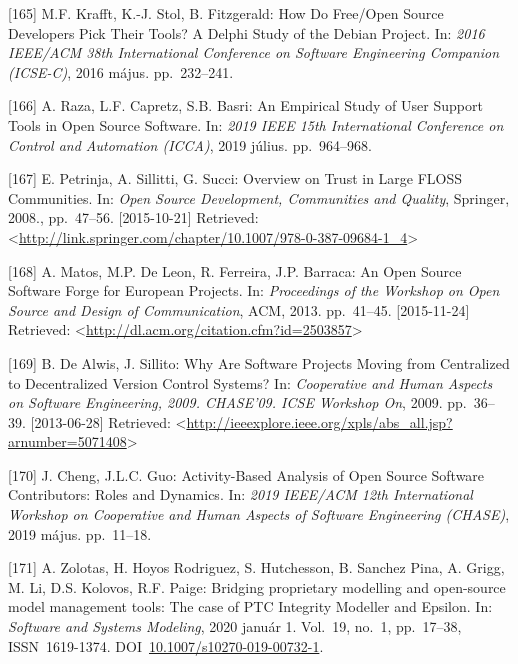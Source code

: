 \documentclass[12pt,magyar,a4paper,oneside]{scrreprt}
\newenvironment{cslreferences}%
  {}%
  {\par}
\begin{document}
\begin{cslreferences}
\leavevmode\hypertarget{ref-krafft_how_2016}{}%
{[}165{]} M.F. Krafft, K.-J. Stol, B. Fitzgerald: How Do Free/Open
Source Developers Pick Their Tools? A Delphi Study of the Debian
Project. In: \emph{2016 IEEE/ACM 38th International Conference on
Software Engineering Companion (ICSE-C)}, 2016 május. pp.~232--241.

\leavevmode\hypertarget{ref-raza_empirical_2019}{}%
{[}166{]} A. Raza, L.F. Capretz, S.B. Basri: An Empirical Study of User
Support Tools in Open Source Software. In: \emph{2019 IEEE 15th
International Conference on Control and Automation (ICCA)}, 2019 július.
pp.~964--968.

\leavevmode\hypertarget{ref-petrinja_overview_2008}{}%
{[}167{]} E. Petrinja, A. Sillitti, G. Succi: Overview on Trust in Large
FLOSS Communities. In: \emph{Open Source Development, Communities and
Quality}, Springer, 2008., pp.~47--56. {[}2015-10-21{]} Retrieved:
\textless{}\url{http://link.springer.com/chapter/10.1007/978-0-387-09684-1_4}\textgreater{}

\leavevmode\hypertarget{ref-matos_open_2013}{}%
{[}168{]} A. Matos, M.P. De Leon, R. Ferreira, J.P. Barraca: An Open
Source Software Forge for European Projects. In: \emph{Proceedings of
the Workshop on Open Source and Design of Communication}, ACM, 2013.
pp.~41--45. {[}2015-11-24{]} Retrieved:
\textless{}\url{http://dl.acm.org/citation.cfm?id=2503857}\textgreater{}

\leavevmode\hypertarget{ref-de_alwis_why_2009}{}%
{[}169{]} B. De Alwis, J. Sillito: Why Are Software Projects Moving from
Centralized to Decentralized Version Control Systems? In:
\emph{Cooperative and Human Aspects on Software Engineering, 2009.
CHASE'09. ICSE Workshop On}, 2009. pp.~36--39. {[}2013-06-28{]}
Retrieved:
\textless{}\url{http://ieeexplore.ieee.org/xpls/abs_all.jsp?arnumber=5071408}\textgreater{}

\leavevmode\hypertarget{ref-cheng_activity-based_2019}{}%
{[}170{]} J. Cheng, J.L.C. Guo: Activity-Based Analysis of Open Source
Software Contributors: Roles and Dynamics. In: \emph{2019 IEEE/ACM 12th
International Workshop on Cooperative and Human Aspects of Software
Engineering (CHASE)}, 2019 május. pp.~11--18.

\leavevmode\hypertarget{ref-zolotas_bridging_2020}{}%
{[}171{]} A. Zolotas, H. Hoyos Rodriguez, S. Hutchesson, B. Sanchez
Pina, A. Grigg, M. Li, D.S. Kolovos, R.F. Paige: Bridging proprietary
modelling and open-source model management tools: The case of PTC
Integrity Modeller and Epsilon. In: \emph{Software and Systems
Modeling}, 2020 január 1. Vol.~19, no.~1, pp.~17--38, ISSN~1619-1374.
DOI~\href{https://doi.org/10.1007/s10270-019-00732-1}{10.1007/s10270-019-00732-1}.


\end{cslreferences}
\end{document}
